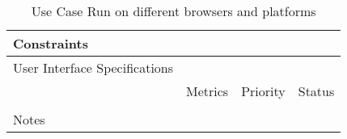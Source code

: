 \begin{table}[H]
\begin{tabularx}{\linewidth}{|l|X|X|X|}
    \hline Constraints                   & \multicolumn{3}{l|}{}                                                                                 \\

    \hline User Interface Specifications & \multicolumn{3}{l|}{}                                                                                 \\

    \hline \multirow{2}{*}{}             & Metrics                                                                           & Priority & Status \\
    \cline{2-4}                          &                                                                                   &          &        \\
    \hline Notes                         & \multicolumn{3}{l|}{}                                                                                 \\
    \hline
  \end{tabularx}
  \caption{Use Case Run on different browsers and platforms}
  \label{tab:use_case_multi_platform}
\end{table}


